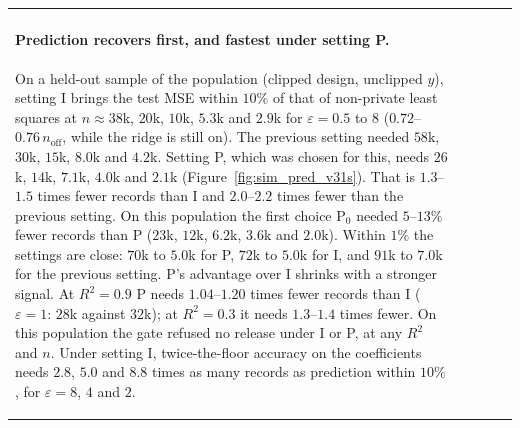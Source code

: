 \begin{tabular}{@{}lllll@{}}
\paragraph{Prediction recovers first, and fastest under setting P.} On a held-out sample of the population (clipped design, unclipped $y$), setting I brings the test MSE within $10\%$ of that of non-private least squares at $n \approx 38$k, $20$k, $10$k, $5.3$k and $2.9$k for $\varepsilon = 0.5$ to $8$ ($0.72$--$0.76\,n_{\mathrm{off}}$, while the ridge is still on). The previous setting needed $58$k, $30$k, $15$k, $8.0$k and $4.2$k. Setting P, which was chosen for this, needs $26$k, $14$k, $7.1$k, $4.0$k and $2.1$k (Figure~\ref{fig:sim_pred_v31s}). That is $1.3$--$1.5$ times fewer records than I and $2.0$--$2.2$ times fewer than the previous setting. On this population the first choice P$_0$ needed $5$--$13\%$ fewer records than P ($23$k, $12$k, $6.2$k, $3.6$k and $2.0$k). Within $1\%$ the settings are close: $70$k to $5.0$k for P, $72$k to $5.0$k for I, and $91$k to $7.0$k for the previous setting. P's advantage over I shrinks with a stronger signal. At $R^2 = 0.9$ P needs $1.04$--$1.20$ times fewer records than I ($\varepsilon = 1$: $28$k against $32$k); at $R^2 = 0.3$ it needs $1.3$--$1.4$ times fewer. On this population the gate refused no release under I or P, at any $R^2$ and $n$. Under setting I, twice-the-floor accuracy on the coefficients needs $2.8$, $5.0$ and $8.8$ times as many records as prediction within $10\%$, for $\varepsilon = 8$, $4$ and $2$.


\end{tabular}
